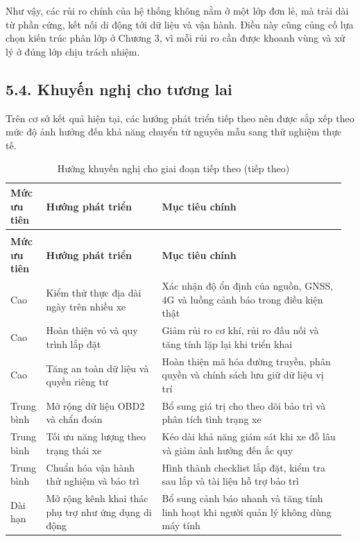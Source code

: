 \documentclass[a4paper]{extarticle}
\newcommand{\thesissettableid}[2]{%
  \renewcommand{\thetable}{#1}%
  \renewcommand{\theHtable}{#2}%
}
\begin{document}
Như vậy, các rủi ro chính của hệ thống không nằm ở một lớp đơn lẻ, mà trải dài
từ phần cứng, kết nối di động tới dữ liệu và vận hành. Điều này cũng củng cố lựa
chọn kiến trúc phân lớp ở Chương 3, vì mỗi rủi ro cần được khoanh vùng và xử lý
ở đúng lớp chịu trách nhiệm.

\subsection{5.4. Khuyến nghị cho tương lai}\label{khuyux1ebfn-nghux1ecb-cho-tux1b0ux1a1ng-lai}

Trên cơ sở kết quả hiện tại, các hướng phát triển tiếp theo nên được sắp xếp
theo mức độ ảnh hưởng đến khả năng chuyển từ nguyên mẫu sang thử nghiệm thực tế.

{\thesissettableid{5.4}{condensed-bang-5-4-huong-khuyen-nghi-cho-giai-doan-tiep-theo}
\def\LTcaptype{table}
\begin{longtable}{|L{0.077\linewidth}|L{0.342\linewidth}|L{0.54\linewidth}|}
\caption{Hướng khuyến nghị cho giai đoạn tiếp theo}\label{tab:condensed-bang-5-4-huong-khuyen-nghi-cho-giai-doan-tiep-theo}\\
\hline
\textbf{Mức ưu tiên} & \textbf{Hướng phát triển} & \textbf{Mục tiêu chính} \\
\hline
\endfirsthead
\caption[]{Hướng khuyến nghị cho giai đoạn tiếp theo (tiếp theo)}\\
\hline
\textbf{Mức ưu tiên} & \textbf{Hướng phát triển} & \textbf{Mục tiêu chính} \\
\hline
\endhead
\endfoot
\endlastfoot
Cao & Kiểm thử thực địa dài ngày trên nhiều xe & Xác nhận độ ổn định của nguồn, GNSS, 4G và luồng cảnh báo trong điều kiện thật \\\hline
Cao & Hoàn thiện vỏ và quy trình lắp đặt & Giảm rủi ro cơ khí, rủi ro đấu nối và tăng tính lặp lại khi triển khai \\\hline
Cao & Tăng an toàn dữ liệu và quyền riêng tư & Hoàn thiện mã hóa đường truyền, phân quyền và chính sách lưu giữ dữ liệu vị trí \\\hline
Trung bình & Mở rộng dữ liệu OBD2 và chẩn đoán & Bổ sung giá trị cho theo dõi bảo trì và phân tích tình trạng xe \\\hline
Trung bình & Tối ưu năng lượng theo trạng thái xe & Kéo dài khả năng giám sát khi xe đỗ lâu và giảm ảnh hưởng đến ắc quy \\\hline
Trung bình & Chuẩn hóa vận hành thử nghiệm và bảo trì & Hình thành checklist lắp đặt, kiểm tra sau lắp và tài liệu hỗ trợ bảo trì \\\hline
Dài hạn & Mở rộng kênh khai thác phụ trợ như ứng dụng di động & Bổ sung cảnh báo nhanh và tăng tính linh hoạt khi người quản lý không dùng máy tính \\\hline
\end{longtable}
}
\end{document}
